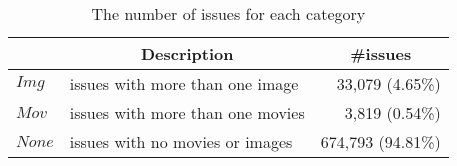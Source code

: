 
\begin{table}[t]
    \begin{center}
    \caption{The number of issues for each category}
    \begin{tabular}{llr}
        \toprule
         & \multicolumn{1}{c}{\textbf{Description}} & \multicolumn{1}{c}{\textbf{\#issues}} \\
        \midrule
        $Img$  & issues with more than one image & 33,079 (4.65\%)\\%
        $Mov$  & issues with more than one movies & 3,819 (0.54\%)\\%
        $None$ & issues with no movies or images & 674,793 (94.81\%)\\ 
        \bottomrule
    \end{tabular}
    \label{tab:issue-category}
    \end{center}
\end{table}
